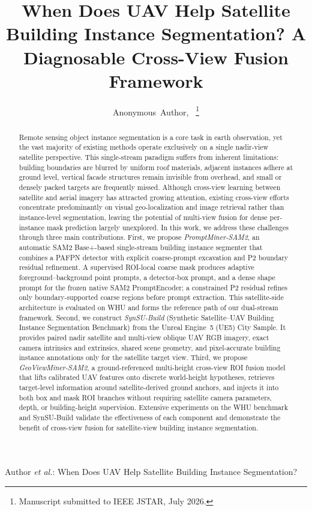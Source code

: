 \documentclass[letterpaper,journal]{IEEEtran}
\begin{document}
\title{When Does UAV Help Satellite Building Instance Segmentation? A Diagnosable Cross-View Fusion Framework}

\author{Anonymous~Author,~
\thanks{Manuscript submitted to IEEE JSTAR, July 2026.}}

%
{Author \MakeLowercase{\textit{et al.}}: When Does UAV Help Satellite Building Instance Segmentation?}

\maketitle

\begin{abstract}
Remote sensing object instance segmentation is a core task in earth observation, yet the vast majority of existing methods operate exclusively on a single nadir-view satellite perspective. This single-stream paradigm suffers from inherent limitations: building boundaries are blurred by uniform roof materials, adjacent instances adhere at ground level, vertical facade structures remain invisible from overhead, and small or densely packed targets are frequently missed. Although cross-view learning between satellite and aerial imagery has attracted growing attention, existing cross-view efforts concentrate predominantly on visual geo-localization and image retrieval rather than instance-level segmentation, leaving the potential of multi-view fusion for dense per-instance mask prediction largely unexplored. In this work, we address these challenges through three main contributions. First, we propose \emph{PromptMiner-SAM2}, an automatic SAM2 Base+-based single-stream building instance segmenter that combines a PAFPN detector with explicit coarse-prompt excavation and P2 boundary residual refinement. A supervised ROI-local coarse mask produces adaptive foreground--background point prompts, a detector-box prompt, and a dense shape prompt for the frozen native SAM2 PromptEncoder; a constrained P2 residual refines only boundary-supported coarse regions before prompt extraction. This satellite-side architecture is evaluated on WHU and forms the reference path of our dual-stream framework. Second, we construct \emph{SynSU-Build} (Synthetic Satellite--UAV Building Instance Segmentation Benchmark) from the Unreal Engine~5 (UE5) City Sample. It provides paired nadir satellite and multi-view oblique UAV RGB imagery, exact camera intrinsics and extrinsics, shared scene geometry, and pixel-accurate building instance annotations only for the satellite target view. Third, we propose \emph{GeoViewMiner-SAM2}, a ground-referenced multi-height cross-view ROI fusion model that lifts calibrated UAV features onto discrete world-height hypotheses, retrieves target-level information around satellite-derived ground anchors, and injects it into both box and mask ROI branches without requiring satellite camera parameters, depth, or building-height supervision. Extensive experiments on the WHU benchmark and SynSU-Build validate the effectiveness of each component and demonstrate the benefit of cross-view fusion for satellite-view building instance segmentation.
\end{abstract}
\end{document}

